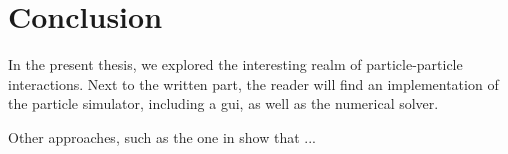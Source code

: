 \chapter{Conclusion}
\label{chap:conclusion}

In the present thesis, we explored the interesting realm of particle-particle interactions.
Next to the written part, the reader will find an implementation of the particle simulator, including a \gls{gui}, as well as the numerical solver.

Other approaches, such as the one in \cite{2015-spectral-method-for-boltzmann-equation} show that ...

